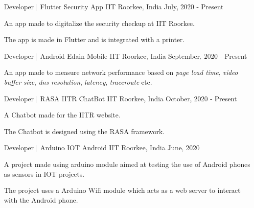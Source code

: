 

\begin{cventries}

  \cventry
    {Developer | Flutter} %
    {Security App} %
    {IIT Roorkee, India} %
    {July, 2020 - Present} %
    {
      \begin{cvitems} %
        \item {An app made to digitalize the security checkup at IIT Roorkee.}
        \item {The app is made in Flutter and is integrated with a printer.}
      \end{cvitems}
    }

  \cventry
    {Developer | Android} %
    {Edain Mobile} %
    {IIT Roorkee, India} %
    {September, 2020 - Present} %
    {
      \begin{cvitems} %
        \item {An app made to measure network performance based on \textit{page load time}, \textit{video buffer size},
        \textit{dns resolution}, \textit{latency}, \textit{traceroute} etc.}
      \end{cvitems}
    }

  \cventry
    {Developer | RASA} %
    {IITR ChatBot} %
    {IIT Roorkee, India} %
    {October, 2020 - Present} %
    {
      \begin{cvitems} %
        \item {A Chatbot made for the IITR website.}
        \item {The Chatbot is designed using the RASA framework.}
      \end{cvitems}
    }

  \cventry
    {Developer | Arduino} %
    {IOT Android} %
    {IIT Roorkee, India} %
    {June, 2020} %
    {
      \begin{cvitems} %
        \item {A project made using arduino module aimed at testing the use of Android phones as sensors in IOT projects.}
        \item {The project uses a Arduino Wifi module which acts as a web server to interact with the Android phone.}
      \end{cvitems}
    }

\end{cventries}
